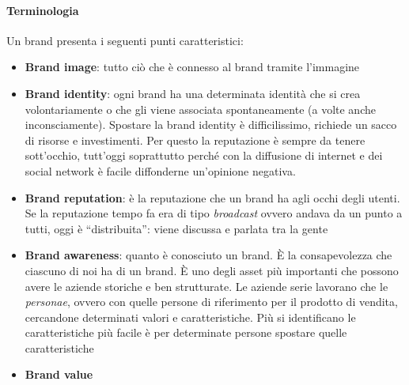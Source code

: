 \paragraph*{Terminologia} Un brand presenta i seguenti punti caratteristici:
\begin{itemize}
 \item \textbf{Brand image}: tutto ciò che è connesso al brand tramite
l'immagine
 \item \textbf{Brand identity}: ogni brand ha una determinata identità che si
crea volontariamente o che gli viene associata spontaneamente (a volte anche
inconsciamente).
Spostare la brand identity è difficilissimo, richiede un sacco di risorse e
investimenti.
Per questo la reputazione è sempre da tenere sott'occhio, tutt'oggi soprattutto
perché con la diffusione di internet e dei social network è facile diffonderne
un'opinione negativa.
 \item \textbf{Brand reputation}: è la reputazione che un brand ha agli occhi
degli utenti.
Se la reputazione tempo fa era di tipo \textit{broadcast} ovvero andava da un
punto a tutti, oggi è ``distribuita'': viene discussa e parlata tra la gente
 \item \textbf{Brand awareness}: quanto è conosciuto un brand.
È la consapevolezza che ciascuno di noi ha di un brand.
È uno degli asset più importanti che possono avere le aziende storiche e ben
strutturate.
Le aziende serie lavorano che le \textit{personae}, ovvero con quelle persone
di riferimento per il prodotto di vendita, cercandone determinati valori e
caratteristiche.
Più si identificano le caratteristiche più facile è per determinate persone
spostare quelle caratteristiche
 \item \textbf{Brand value}
\end{itemize}
